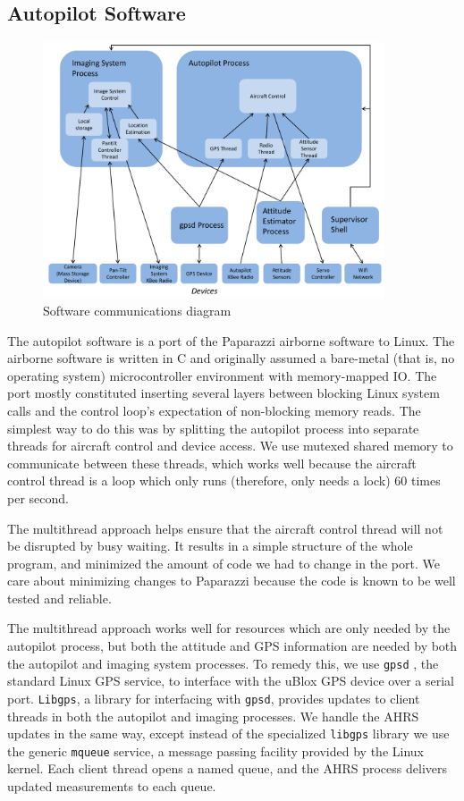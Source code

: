 \documentclass[pdftex,10pt,letter]{article}
\begin{document}
\subsection{Autopilot Software}
\label{sec:autopilot_software}
\begin{figure}[t]
	\centering
	\includegraphics[width=0.9\textwidth]{../images/software_comm_diagram.pdf}
	\caption{Software communications diagram}	
	\label{fig:software_comm_diagram}
\end{figure}

The autopilot software is a port of the Paparazzi airborne software to Linux. The airborne software is written in C and originally assumed a bare-metal (that is, no operating system) microcontroller environment with memory-mapped IO. The port mostly constituted inserting several layers between blocking Linux system calls and the control loop's expectation of non-blocking memory reads. The simplest way to do this was by splitting the autopilot process into separate threads for aircraft control and device access. We use mutexed shared memory to communicate between these threads, which works well because the aircraft control thread is a loop which only runs (therefore, only needs a lock) 60 times per second.

The multithread approach helps ensure that the aircraft control thread will not be disrupted by busy waiting. It results in a simple structure of the whole program, and minimized the amount of code we had to change in the port. We care about minimizing changes to Paparazzi because the code is known to be well tested and reliable.

The multithread approach works well for resources which are only needed by the autopilot process, but both the attitude and GPS information are needed by both the autopilot and imaging system processes. To remedy this, we use \texttt{gpsd} \cite{gpsd}, the standard Linux GPS service, to interface with the uBlox GPS device over a serial port. \texttt{Libgps}, a library for interfacing with \texttt{gpsd}, provides updates to client threads in both the autopilot and imaging processes. We handle the AHRS updates in the same way, except instead of the specialized \texttt{libgps} library we use the generic \texttt{mqueue} \cite{mqueue} service, a message passing facility provided by the Linux kernel. Each client thread opens a named queue, and the AHRS process delivers updated measurements to each queue.
\end{document}
